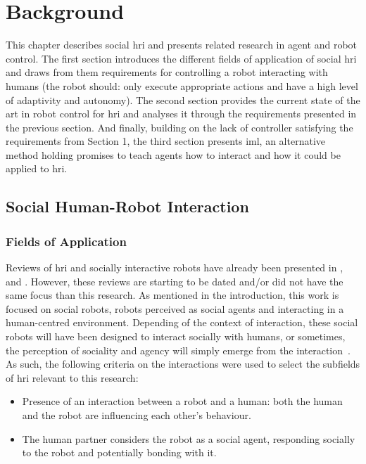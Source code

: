 \chapter{Background} \label{chap:background}
\glsresetall

This chapter describes social \gls{hri} and presents related research in agent and robot control. The first section introduces the different fields of application of social \gls{hri} and draws from them requirements for controlling a robot interacting with humans (the robot should: only execute appropriate actions and have a high level of adaptivity and autonomy). The second section provides the current state of the art in robot control for \gls{hri} and analyses it through the requirements presented in the previous section. And finally, building on the lack of controller satisfying the requirements from Section 1, the third section presents \gls{iml}, an alternative method holding promises to teach agents how to interact and how it could be applied to \gls{hri}.

\section{Social Human-Robot Interaction}

\subsection{Fields of Application} \label{ssec:back_hri}

Reviews of \gls{hri} and socially interactive robots have already been presented in \cite{fong2003survey}, \cite{goodrich2007human} and \cite{sheridan2016human}. However, these reviews are starting to be dated and/or did not have the same focus than this research. As mentioned in the introduction, this work is focused on social robots, robots perceived as social agents and interacting in a human-centred environment. Depending of the context of interaction, these social robots will have been designed to interact socially with humans, or sometimes, the perception of sociality and agency will simply emerge from the interaction~\citep{fincannon2004evidence}. As such, the following criteria on the interactions were used to select the subfields of \gls{hri} relevant to this research:
\begin{itemize}
	\item Presence of an interaction between a robot and a human: both the human and the robot are influencing each other's behaviour.
	\item The human partner considers the robot as a social agent, responding socially to the robot and potentially bonding with it.
\end{itemize}

